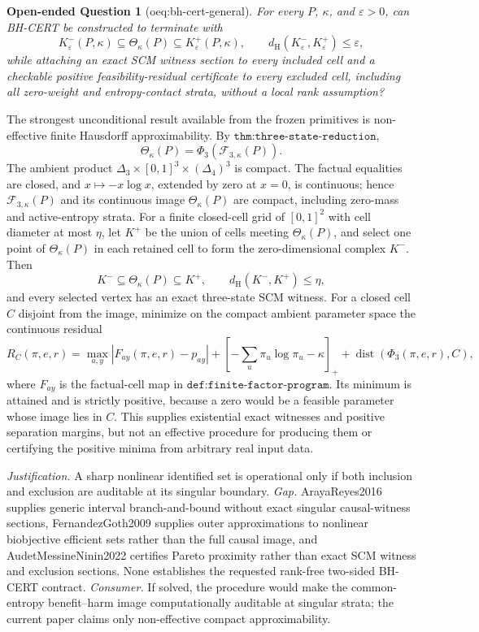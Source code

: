 \documentclass{article}
\newtheorem{openendedquestion}{Open-ended Question}
\begin{document}
\begin{openendedquestion}[oeq:bh-cert-general]\label{oeq:bh-cert-general}
For every \(P\), \(\kappa\), and \(\varepsilon>0\), can BH-CERT be constructed to terminate with \[K^-_\varepsilon(P,\kappa)\subseteq\Theta_\kappa(P)\subseteq K^+_\varepsilon(P,\kappa),\qquad d_{\mathrm H}(K^-_\varepsilon,K^+_\varepsilon)\leq\varepsilon,\] while attaching an exact SCM witness section to every included cell and a checkable positive feasibility-residual certificate to every excluded cell, including all zero-weight and entropy-contact strata, without a local rank assumption?
\end{openendedquestion}
The strongest unconditional result available from the frozen primitives is non-effective finite Hausdorff approximability.  By \(\texttt{thm:three-state-reduction}\),
\[
\Theta_\kappa(P)=\Phi_3(\mathcal F_{3,\kappa}(P)).
\]
The ambient product \(\Delta_3\times[0,1]^3\times(\Delta_4)^3\) is compact.  The factual equalities are closed, and \(x\mapsto-x\log x\), extended by zero at \(x=0\), is continuous; hence \(\mathcal F_{3,\kappa}(P)\) and its continuous image \(\Theta_\kappa(P)\) are compact, including zero-mass and active-entropy strata.  For a finite closed-cell grid of \([0,1]^2\) with cell diameter at most \(\eta\), let \(K^+\) be the union of cells meeting \(\Theta_\kappa(P)\), and select one point of \(\Theta_\kappa(P)\) in each retained cell to form the zero-dimensional complex \(K^-\).  Then
\[
K^-\subseteq\Theta_\kappa(P)\subseteq K^+,
\qquad d_{\mathrm H}(K^-,K^+)\leq\eta,
\]
and every selected vertex has an exact three-state SCM witness.  For a closed cell \(C\) disjoint from the image, minimize on the compact ambient parameter space the continuous residual
\[
R_C(\pi,e,r)=
\max_{a,y}|F_{ay}(\pi,e,r)-p_{ay}|
+\left[-\sum_u\pi_u\log\pi_u-\kappa\right]_+
+\operatorname{dist}(\Phi_3(\pi,e,r),C),
\]
where \(F_{ay}\) is the factual-cell map in \(\texttt{def:finite-factor-program}\).  Its minimum is attained and is strictly positive, because a zero would be a feasible parameter whose image lies in \(C\).  This supplies existential exact witnesses and positive separation margins, but not an effective procedure for producing them or certifying the positive minima from arbitrary real input data.
\par\smallskip\noindent \textit{Justification.} A sharp nonlinear identified set is operational only if both inclusion and exclusion are auditable at its singular boundary. \textit{Gap.} ArayaReyes2016 supplies generic interval branch-and-bound without exact singular causal-witness sections, FernandezGoth2009 supplies outer approximations to nonlinear biobjective efficient sets rather than the full causal image, and AudetMessineNinin2022 certifies Pareto proximity rather than exact SCM witness and exclusion sections. None establishes the requested rank-free two-sided BH-CERT contract. \textit{Consumer.} If solved, the procedure would make the common-entropy benefit--harm image computationally auditable at singular strata; the current paper claims only non-effective compact approximability.
\end{document}
